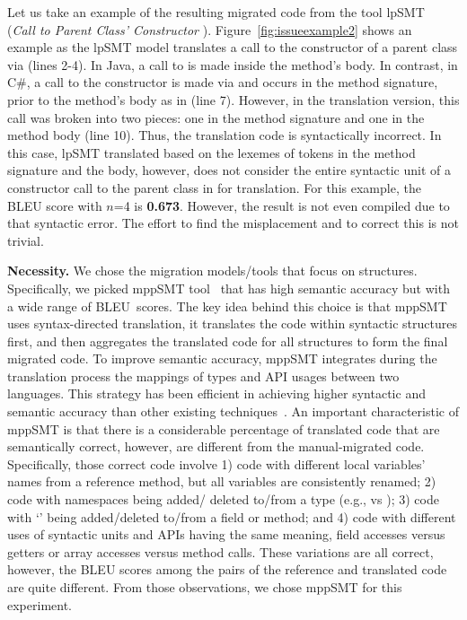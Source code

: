 
Let us take an example of the resulting migrated code from the tool
lpSMT~\cite{fse13-nier} ({\em Call to Parent Class' Constructor
  }). Figure~\ref{fig:issueexample2} shows an example
as the lpSMT model translates a call to the constructor of a parent
class via  (lines 2-4). In Java, a call to  is
made inside the method's body. In contrast, in C\#, a call to the
constructor is made via  and occurs in the method
signature, \ie prior to the method's body as in
 (line 7). However, in the translation
version, this call was broken into two pieces: one in the method
signature  and one in the method body  (line 10). Thus, the translation code is
syntactically incorrect. In this case, lpSMT translated based on the
lexemes of tokens in the method signature and the body, however, does
not consider the entire syntactic unit of a constructor call to the
parent class in  for translation. For this example, the
BLEU score with $n$=4 is {\bf 0.673}. However, the result is not even
compiled due to that syntactic error. The effort to find the
misplacement and to correct this is not trivial.

{\bf Necessity.} We chose the migration models/tools that focus on
structures. Specifically, we picked mppSMT tool~\cite{ase15} that has
high semantic accuracy but with a wide range of BLEU~scores. The key
idea behind this choice is that mppSMT uses syntax-directed
translation, \ie it translates the code within syntactic structures
first, and then aggregates the translated code for all structures to
form the final migrated code. To improve semantic accuracy, mppSMT
integrates during the translation process the mappings of types and
API usages between two languages. This strategy has been efficient in
achieving higher syntactic and semantic accuracy than other existing
techniques~\cite{ase15}. An important characteristic of mppSMT is that
there is a considerable percentage of translated code that are
semantically correct, however, are different from the manual-migrated
code. Specifically, those correct code involve 1) code with different
local variables' names from a reference method, but all variables are
consistently renamed; 2) code with namespaces being added/ deleted
to/from a type (e.g.,  vs ); 3) code
with `' being added/deleted to/from a field or method; and
4) code with different uses of syntactic units and APIs having the
same meaning, \eg field accesses versus getters or array accesses
versus method calls. These variations are all correct, however, the
BLEU scores among the pairs of the reference and translated code are
quite different.  From those observations, we chose mppSMT for this
experiment.


